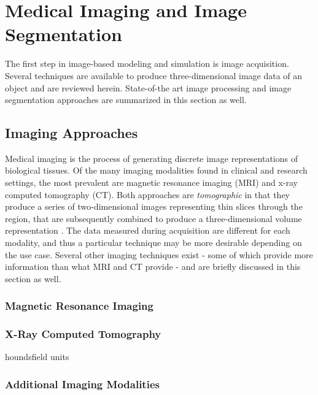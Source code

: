 \chapter{Medical Imaging and Image Segmentation}
%

The first step in image-based modeling and simulation is image acquisition. Several techniques are available to produce three-dimensional image data of an object and are reviewed herein. State-of-the art image processing and image segmentation approaches are summarized in this section as well.

\section{Imaging Approaches}
\label{Imaging Approaches}

Medical imaging is the process of generating discrete image representations of biological tissues. Of the many imaging modalities found in clinical and research settings, the most prevalent are magnetic resonance imaging (MRI) and x-ray computed tomography (CT). Both approaches are \textit{tomographic} in that they produce a series of two-dimensional images representing thin slices through the region, that are subsequently combined to produce a three-dimensional volume representation \cite{larobina_murino_2014}. The data measured during acquisition are different for each modality, and thus a particular technique may be more desirable depending on the use case. Several other imaging techniques exist - some of which provide more information than what MRI and CT provide - and are briefly discussed in this section as well.

\subsection{Magnetic Resonance Imaging}
\label{Magnetic Resonance Imaging}



\subsection{X-Ray Computed Tomography}
\label{X-Ray Computed Tomography}

houndsfield units

\subsection{Additional Imaging Modalities}
\label{Other Imaging Modalities}

